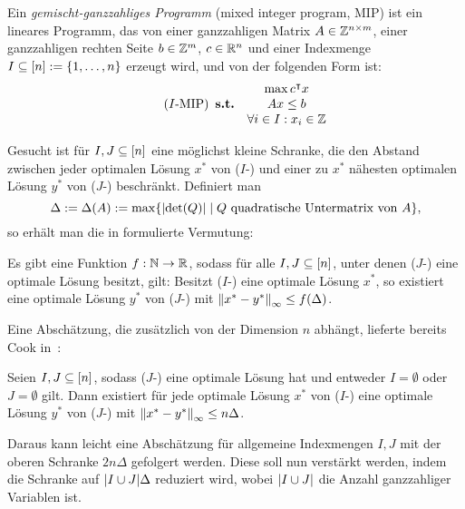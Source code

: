 Ein \emph{gemischt-ganzzahliges Programm} (mixed integer program, MIP) ist ein lineares Programm, das von einer ganzzahligen Matrix $A\in\mathbb{Z}^{n\times m}$, einer ganzzahligen rechten Seite $b\in\mathbb{Z}^m$, $c\in\mathbb{R}^n$ und einer Indexmenge $I\subseteq[n]:=\{1,\dots,n\}$ erzeugt wird, und von der folgenden Form ist:
\begin{equation}\tag{$I$-\MIPI}
\begin{array}{lc}
&\max c\transpose x \\
\subjectTo &Ax\leq b\\
&\forall i\in I: x_i\in\Z
\end{array}
\end{equation}

Gesucht ist für $I,J\subseteq[n]$ eine möglichst kleine Schranke, die den Abstand zwischen jeder optimalen Lösung $x^*$ von ($I$-\MIPI) und einer zu $x^*$ nähesten optimalen Lösung $y^*$ von ($J$-\MIPI) beschränkt.
Definiert man
$$\Delta:=\Delta(A):=\max\{\lvert  \det(Q) \rvert \mid Q \text{ quadratische Untermatrix von } A \},$$
so erhält man die in \cite{Paat2018} formulierte Vermutung:

\renewcommand{\theconjecture}{1.1}
\begin{conjecture}\label{con:delta}
	Es gibt eine Funktion $f: \mathbb{N}\rightarrow\mathbb{R}$, sodass für alle $I,J\subseteq[n]$, unter denen ($J$-\MIPI) eine optimale Lösung besitzt, gilt:
	Besitzt ($I$-\MIPI) eine optimale Lösung $x^*$, so existiert eine optimale 
	Lösung $y^*$ von ($J$-\MIPI) mit $\left\lVert x^* - y^*\right\rVert_\infty\leq f(\Delta)$.
\end{conjecture}

Eine Abschätzung, die zusätzlich von der Dimension $n$ abhängt, lieferte bereits Cook in~\cite[Theorem 1 und Bemerkung 1]{Cook1986}:

\renewcommand{\thetheorem}{2.1}
\begin{theorem}[Cook et al., 1986]\label{thm:cook}
	Seien $I, J\subseteq[n]$, sodass ($J$-\MIPI) eine optimale Lösung hat und entweder $I=\emptyset$ oder $J=\emptyset$ gilt.
	Dann existiert für jede optimale Lösung $x^*$ von ($I$-\MIPI) eine optimale Lösung $y^*$ von ($J$-\MIPI) mit $\left\lVert x^*-y^*\right\rVert_\infty\leq n\Delta$.
\end{theorem}

Daraus kann leicht eine Abschätzung für allgemeine Indexmengen $I,J$ mit der oberen Schranke $2n\Delta$ gefolgert werden.
Diese soll nun verstärkt werden, indem die Schranke auf $\lvert I\cup J \rvert\Delta$ reduziert wird, wobei $\lvert I\cup J \rvert$ die Anzahl ganzzahliger Variablen ist.

